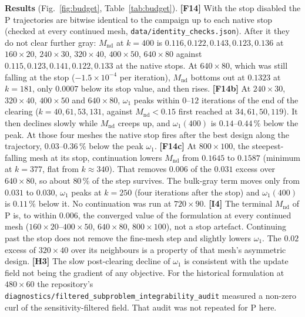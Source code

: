 \documentclass[10pt,a4paper]{article}
\newcommand{\Mnd}{M_{\mathrm{nd}}}
\newcommand{\code}[1]{\texttt{\small #1}}
\newcommand{\fact}[1]{\textbf{[F#1]}}
\newcommand{\interp}[1]{\textbf{[I#1]}}
\newcommand{\hyp}[1]{\textbf{[H#1]}}
\begin{document}
\par\noindent\textbf{Results} (Fig.~\ref{fig:budget}, Table~\ref{tab:budget}). \fact{14} With the stop disabled the P trajectories are bitwise identical to the campaign up to each native stop (checked at every continued mesh, \code{data/identity\_checks.json}). After it they do not clear further gray: $\Mnd$ at $k=400$ is $0.116,0.122,0.143,0.123,0.136$ at $160\times20$, $240\times30$, $320\times40$, $400\times50$, $640\times80$ against $0.115,0.123,0.141,0.122,0.133$ at the native stops. At $640\times80$, which was still falling at the stop ($-1.5\times10^{-4}$ per iteration), $\Mnd$ bottoms out at $0.1323$ at $k=181$, only $0.0007$ below its stop value, and then rises. \fact{14b} At $240\times30$, $320\times40$, $400\times50$ and $640\times80$, $\omega_1$ peaks within $0$--$12$ iterations of the end of the clearing ($k=40,61,53,131$, against $\Mnd<0.15$ first reached at $34,61,50,119$). It then declines slowly while $\Mnd$ creeps up, and $\omega_1(400)$ is $0.14$--$0.44\,\%$ below the peak. At those four meshes the native stop fires after the best design along the trajectory, $0.03$--$0.36\,\%$ below the peak $\omega_1$. \fact{14c} At $800\times100$, the steepest-falling mesh at its stop, continuation lowers $\Mnd$ from $0.1645$ to $0.1587$ (minimum at $k=377$, flat from $k\approx340$). That removes $0.006$ of the $0.031$ excess over $640\times80$, so about $80\,\%$ of the step survives. The bulk-gray term moves only from $0.031$ to $0.030$, $\omega_1$ peaks at $k=250$ (four iterations after the stop) and $\omega_1(400)$ is $0.11\,\%$ below it. No continuation was run at $720\times90$.
\interp{4} The terminal $\Mnd$ of P is, to within $0.006$, the converged value of the formulation at every continued mesh ($160\times20$--$400\times50$, $640\times80$, $800\times100$), not a stop artefact. Continuing past the stop does not remove the fine-mesh step and slightly lowers $\omega_1$. The $0.02$ excess of $320\times40$ over its neighbours is a property of that mesh's asymmetric design. \hyp{3} The slow post-clearing decline of $\omega_1$ is consistent with the update field not being the gradient of any objective. For the historical formulation at $480\times60$ the repository's \code{diagnostics/filtered\_subproblem\_integrability\_audit} measured a non-zero curl of the sensitivity-filtered field. That audit was not repeated for P here.
\begin{table}[htb]\centering\footnotesize
\caption{P with the stop disabled: discreteness and $\omega_1$ at the native stop, at the minimum of $\Mnd$, at the maximum of $\omega_1$ and at $k=400$ (\code{data/iter\_budget400\_*.csv}).}
\label{tab:budget}

\end{table}
\end{document}

